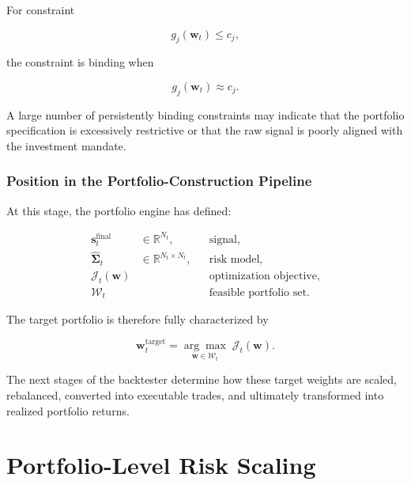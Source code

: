 \documentclass[11pt,a4paper]{article}
\begin{document}
For constraint

\begin{equation}
g_j(\mathbf{w}_t)\leq c_j,
\end{equation}

the constraint is binding when

\begin{equation}
\boxed{
g_j(\mathbf{w}_t)
\approx
c_j.
}
\end{equation}

A large number of persistently binding constraints may indicate that the
portfolio specification is excessively restrictive or that the raw signal is
poorly aligned with the investment mandate.


\subsubsection{Position in the Portfolio-Construction Pipeline}

At this stage, the portfolio engine has defined:

\begin{equation}
\boxed{
\begin{aligned}
\mathbf{s}_t^{\mathrm{final}}
&\in
\mathbb{R}^{N_t},
&&
\text{signal},
\\
\widehat{\boldsymbol{\Sigma}}_t
&\in
\mathbb{R}^{N_t\times N_t},
&&
\text{risk model},
\\
\mathcal{J}_t(\mathbf{w})
&&&
\text{optimization objective},
\\
\mathcal{W}_t
&&&
\text{feasible portfolio set}.
\end{aligned}
}
\end{equation}

The target portfolio is therefore fully characterized by

\begin{equation}
\boxed{
\mathbf{w}_t^{\mathrm{target}}
=
\underset{\mathbf{w}\in\mathcal{W}_t}{\arg\max}
\;
\mathcal{J}_t(\mathbf{w}).
}
\end{equation}

The next stages of the backtester determine how these target weights are scaled,
rebalanced, converted into executable trades, and ultimately transformed into
realized portfolio returns.

\section{Portfolio-Level Risk Scaling}
\label{sec:portfolio_level_risk_scaling}
\end{document}
